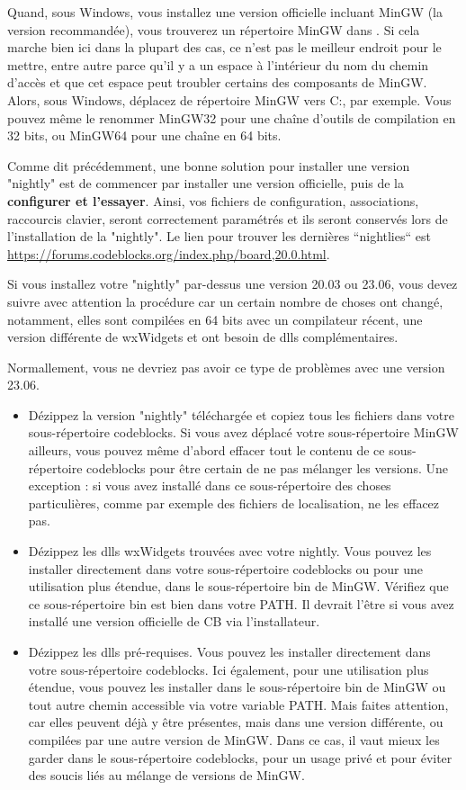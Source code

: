 Quand, sous Windows, vous installez une version officielle incluant MinGW (la version recommandée), vous trouverez un répertoire MinGW dans . Si cela marche bien ici dans la plupart des cas, ce n'est pas le meilleur endroit pour le mettre, entre autre parce qu'il y a un espace à l'intérieur du nom du chemin d'accès et que cet espace peut troubler certains des composants de MinGW. Alors, sous Windows, déplacez de répertoire MinGW vers C:, par exemple. Vous pouvez même le renommer MinGW32 pour une chaîne d'outils de compilation en 32 bits, ou MinGW64 pour une chaîne en 64 bits.

Comme dit précédemment, une bonne solution pour installer une version "nightly" est de commencer par installer une version officielle, puis de la \textbf{configurer et l'essayer}. Ainsi, vos fichiers de configuration, associations, raccourcis clavier, seront correctement paramétrés et ils seront conservés lors de l'installation de la "nightly". Le lien pour trouver les dernières “nightlies“ est \url{https://forums.codeblocks.org/index.php/board,20.0.html}.

Si vous installez votre "nightly" par-dessus une version 20.03 ou 23.06, vous devez suivre avec attention la procédure car un certain nombre de choses ont changé, notamment, elles sont compilées en 64 bits avec un compilateur récent, une version différente de wxWidgets et ont besoin de dlls complémentaires.

Normallement, vous ne devriez pas avoir ce type de problèmes avec une version 23.06.
\begin{itemize}
\item Dézippez la version "nightly" téléchargée et copiez tous les fichiers dans votre sous-répertoire codeblocks. Si vous avez déplacé votre sous-répertoire MinGW ailleurs, vous pouvez même d'abord effacer tout le contenu de ce sous-répertoire codeblocks pour être certain de ne pas mélanger les versions. Une exception : si vous avez installé dans ce sous-répertoire des choses particulières, comme par exemple des fichiers de localisation, ne les effacez pas.
\item Dézippez les dlls wxWidgets trouvées avec votre nightly. Vous pouvez les installer directement dans votre sous-répertoire codeblocks ou pour une utilisation plus étendue, dans le sous-répertoire bin de MinGW. Vérifiez que ce sous-répertoire bin est bien dans votre PATH. Il devrait l'être si vous avez installé une version officielle de CB via l'installateur.
\item Dézippez les dlls pré-requises. Vous pouvez les installer directement dans votre sous-répertoire codeblocks. Ici également, pour une utilisation plus étendue, vous pouvez les installer dans le sous-répertoire bin de MinGW ou tout autre chemin accessible via votre variable PATH. Mais faites attention, car elles peuvent déjà y être présentes, mais dans une version différente, ou compilées par une autre version de MinGW. Dans ce cas, il vaut mieux les garder dans le sous-répertoire codeblocks, pour un usage privé et pour éviter des soucis liés au mélange de versions de MinGW.
\end{itemize}

